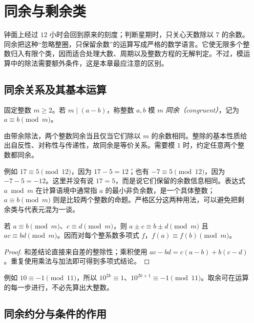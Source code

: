 \setcounter{chapter}{3} %
\chapter{同余与剩余类}
\label{ch:congruences}

钟面上经过 $12$ 小时会回到原来的刻度；判断星期时，只关心天数除以 $7$ 的余数。同余把这种“忽略整圈，只保留余数”的运算写成严格的数学语言。它使无限多个整数归入有限个类，因而适合处理大数、周期以及整数方程的无解判定。不过，模运算中的除法需要额外条件，这是本章最应注意的区别。

\section{同余关系及其基本运算}

\begin{definition}
固定整数 $m\ge2$。若 $m\mid(a-b)$，称整数 $a,b$ 模 $m$ \emph{同余（congruent）}，记为 $a\equiv b\pmod m$。
\end{definition}

由带余除法，两个整数同余当且仅当它们除以 $m$ 的余数相同。整除的基本性质给出自反性、对称性与传递性，故同余是等价关系。需要模 $1$ 时，约定任意两个整数都同余。

例如 $17\equiv5\pmod{12}$，因为 $17-5=12$；也有 $-7\equiv5\pmod{12}$，因为 $-7-5=-12$。这里并没有说 $17=5$，而是说它们保留的余数信息相同。表达式 $a\bmod m$ 在计算语境中通常指 $a$ 的最小非负余数，是一个具体整数；$a\equiv b\pmod m$ 则是比较两个整数的命题。严格区分这两种用法，可以避免把剩余类与代表元混为一谈。

\begin{proposition}
若 $a\equiv b\pmod m$、$c\equiv d\pmod m$，则 $a\pm c\equiv b\pm d\pmod m$ 且 $ac\equiv bd\pmod m$。因而对每个整系数多项式 $f$，$f(a)\equiv f(b)\pmod m$。
\end{proposition}
\begin{proof}
和差结论直接来自差的整除性；乘积使用 $ac-bd=c(a-b)+b(c-d)$。重复使用乘法与加法即可得到多项式结论。
\end{proof}

例如 $10\equiv-1\pmod{11}$，所以 $10^{2k}\equiv1$、$10^{2k+1}\equiv-1\pmod{11}$。取余可在运算的每一步进行，不必先算出大整数。

\section{同余约分与条件的作用}

